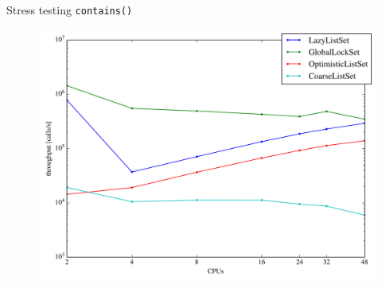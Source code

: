 \documentclass[aspectratio=43]{beamer}
\begin{document}
\begin{frame}{Stress testing \texttt{contains()}}
  \begin{figure}
    \includegraphics[width=\textwidth]{contains}
  \end{figure}  
\end{frame}
\end{document}
